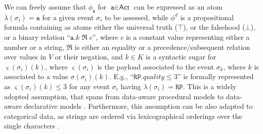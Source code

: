We can freely assume that %
$\phi_\texttt{a}$ for $\texttt{a}\in\textsf{Act}$ can be expressed as an atom $\lambda(\sigma_i)=\texttt{a}$ for a given event $\sigma_i$ to be assessed, while $\phi^d$ is a propositional formula containing as atoms either
the universal truth ($\top$), or the falsehood ($\bot$), or a %
binary relation ``$\texttt{a}.k\;\Re\;c$'', where $c$ is a constant value 
%
%
%
representing either a number or a string, $\Re$ is either an equality or a precedence/subsequent relation over values in $V$ or their negation, and $k\in K$ is a syntactic sugar for $\varsigma(\sigma_i)(k)$, where $\varsigma(\sigma_i)$ is the payload associated to the event $\sigma_k$, where $k$ is associated to a value $\sigma(\sigma_i)(k)$. E.g., ``$\texttt{RP}.\textit{quality}\leq 3$'' is formally represented as $\varsigma(\sigma_i)(k)\leq 3$ for any event $\sigma_i$ having $\lambda(\sigma_i)=\texttt{RP}$.  This is a widely adopted assumption, that spans from data-aware procedural models \cite{MultiPerspective} to data-aware declarative models \cite{10.1007/978-3-642-40176-3_8}. Furthermore, this assumption can be also adapted to categorical data, as strings are ordered via lexicographical orderings over the single characters \cite{MultiPerspective}.

